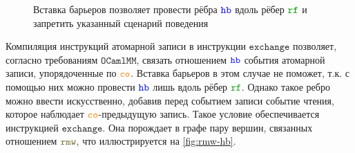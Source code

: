 \documentclass[14pt]{matmex-diploma-custom}
\newcommand{\OMM}{\mathtt{OCaml}\allowbreak \mathtt{MM}}
\begin{document}
\newcommand{\offsetfive}{3}
\begin{figure}[h]
  \centering
  \begin{minipage}{0.9\textwidth}
    \centering
  \end{minipage}
  \caption{Вставка барьеров позволяет провести рёбра $\lHB$ вдоль рёбер $\lRF$ и запретить указанный сценарий поведения}
  \label{fig:fences-hb}
\end{figure}


Компиляция инструкций атомарной записи в инструкции $\mathtt{exchange}$ позволяет, согласно требованиям $\OMM$, связать отношением $\lHB$ события атомарной записи, упорядоченные по $\lCO$. Вставка барьеров в этом случае не поможет, т.к. с помощью них можно провести $\lHB$ лишь вдоль рёбер $\lRF$. Однако такое ребро можно ввести искусственно, добавив перед событием записи событие чтения, которое наблюдает $\lCO$-предыдущую запись. Такое условие обеспечивается инструкцией $\mathtt{exchange}$. Она порождает в графе пару вершин, связанных отношением $\lRMW$, что иллюстрируется на \cref{fig:rmw-hb}.
\end{document}
